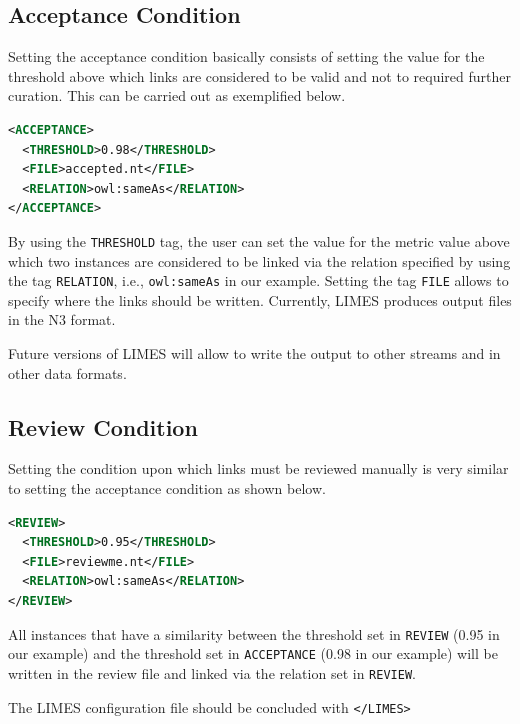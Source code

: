 \documentclass[a4paper, 11pt]{article}
\begin{document}
\subsection{Acceptance Condition}
Setting the acceptance condition basically consists of setting the value for the threshold above which links are considered to be valid and not to required further curation. This can be carried out as exemplified below.
\begin{ttfamily}
\begin{lstlisting}[language=XML,basicstyle=\scriptsize,numberstyle=\tiny]
<ACCEPTANCE>
  <THRESHOLD>0.98</THRESHOLD>
  <FILE>accepted.nt</FILE>
  <RELATION>owl:sameAs</RELATION>
</ACCEPTANCE>
\end{lstlisting}
\end{ttfamily}

By using the \verb#THRESHOLD# tag, the user can set the value for the metric value above which two instances are considered to be linked via the relation specified by using the tag \verb#RELATION#, i.e., \verb#owl:sameAs# in our example. Setting the tag \verb#FILE# allows to specify where the links should be written. Currently, LIMES produces output files in the N3 format.

Future versions of LIMES will allow to write the output to other streams and in other data formats.

\subsection{Review Condition}
Setting the condition upon which links must be reviewed manually is very similar to setting the acceptance condition as shown below.

\begin{ttfamily}
\begin{lstlisting}[language=XML,basicstyle=\scriptsize,numberstyle=\tiny]
<REVIEW>
  <THRESHOLD>0.95</THRESHOLD>
  <FILE>reviewme.nt</FILE>
  <RELATION>owl:sameAs</RELATION>
</REVIEW>
\end{lstlisting}
\end{ttfamily}

All instances that have a similarity between the threshold set in \texttt{REVIEW} (0.95 in our example) and the threshold set in \texttt{ACCEPTANCE} (0.98 in our example) will be written in the review file and linked via the relation set in \texttt{REVIEW}.

The LIMES configuration file should be concluded with \texttt{</LIMES>}
\end{document}
